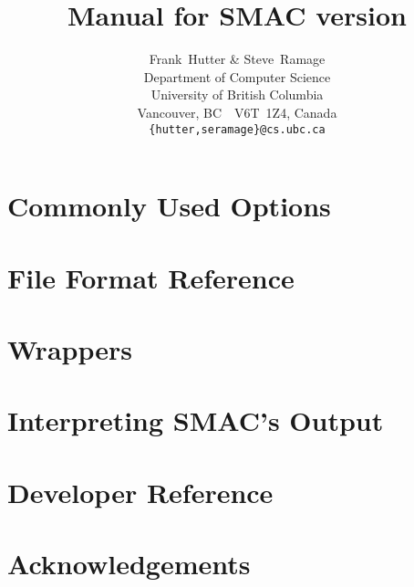 \documentclass[11pt,letterpaper,oneside]{article}
\begin{document}
\title{Manual for SMAC version }

\author{
Frank~Hutter \& Steve~Ramage\\
Department of Computer Science\\
University of British Columbia\\
Vancouver, BC\ \ V6T~1Z4, Canada\\
\texttt{\{hutter,seramage\}@cs.ubc.ca}
}


\maketitle

\tableofcontents



  
\section{Commonly Used Options}



\section{File Format Reference} 



\section{Wrappers}



\section{Interpreting SMAC's Output}



 
\section{Developer Reference}



\section{Acknowledgements}
\end{document}
